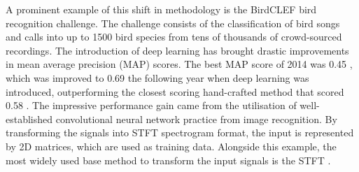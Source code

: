 \documentclass[10pt, twocolumn]{llncs}
\newcommand{\dzn}[1]{\todo[color=yellow!30]{[dz] #1}}
\newcommand{\bpN}[1]{\todo[inline, size=\small, color=purple!30]{[bp] #1}}
\begin{document}


A prominent example of this shift in methodology is the BirdCLEF bird recognition challenge. The challenge consists of the classification of bird songs and calls into up to 1500 bird species from tens of thousands of crowd-sourced recordings. The introduction of deep learning has brought drastic improvements in mean average precision (MAP) scores. The best MAP score of 2014 was 0.45 \cite{goeau2015lifeclef}, which was improved to 0.69 the following year when deep learning was introduced, outperforming the closest scoring hand-crafted method that scored 0.58 \cite{joly2016lifeclef}. The impressive performance gain came from the utilisation of well-established convolutional neural network practice from image recognition. By transforming the signals into STFT spectrogram format, the input is represented by 2D matrices, which are used as training data. Alongside this example, the most widely used base method to transform the input signals is the STFT  \cite{sainath2015deep,gwardys2014deep,potamitis2016deep}.
\end{document}
